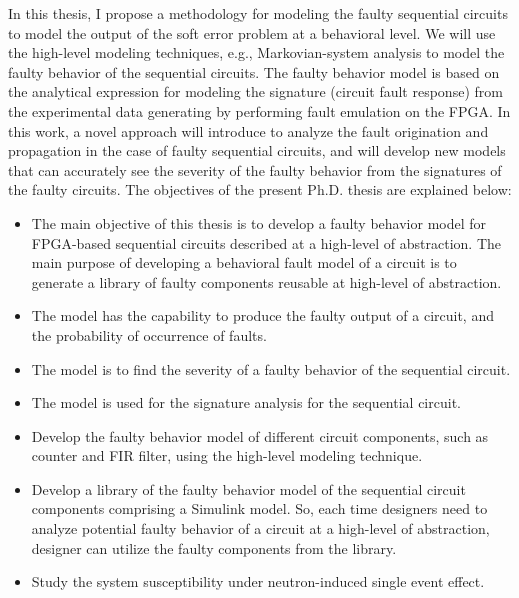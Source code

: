 In this thesis, I propose a methodology for modeling the faulty sequential circuits to model the output of the soft error problem at a behavioral level. We will use the high-level modeling techniques, e.g., Markovian-system analysis to model the faulty behavior of the sequential circuits. The faulty behavior model is based on the analytical expression for modeling the signature (circuit fault response) from the experimental data generating by performing fault emulation on the FPGA. In this work, a novel approach will introduce to analyze the fault origination and propagation in the case of faulty sequential circuits, and will develop new models that can accurately see the severity of the faulty behavior from the signatures of the faulty circuits. The objectives of the present Ph.D. thesis are explained below: 

\begin{itemize}


\item{The main objective of this thesis is to develop a faulty behavior model for FPGA-based
sequential circuits described at a high-level of abstraction. The main purpose of developing a behavioral fault model of a circuit is to generate a library of faulty components reusable at high-level of abstraction}.



\item{The model has the capability to produce the faulty output of a circuit, and the probability of occurrence of faults.}

\item The model is to find the severity of a faulty behavior of the sequential circuit. 

\item The model is used for the signature analysis for the sequential circuit.
\item{Develop the faulty behavior model of different circuit
components, such as counter and FIR filter, using the high-level modeling technique.}

\item{Develop a library of the faulty behavior model of the sequential circuit
components comprising a Simulink model. So, each time designers need to analyze potential faulty behavior of a circuit at a high-level of abstraction, designer can utilize the faulty components from the library}.

\item Study the system susceptibility under neutron-induced single event effect.



\end{itemize}
